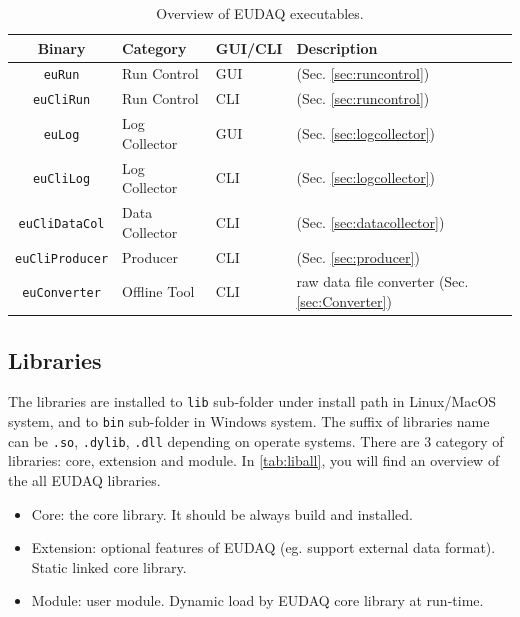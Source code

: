 \begin{table}
\centering
\small
\begin{tabular}{ c | l | l | p{4cm}}
  \textbf{Binary} & \textbf{Category} & \textbf{GUI/CLI}  & \textbf{Description}\\
  \hline
  \hline
  \texttt{euRun} & Run Control & GUI & (Sec. \ref{sec:runcontrol}) \\
  \texttt{euCliRun} & Run Control & CLI & (Sec. \ref{sec:runcontrol}) \\
  \texttt{euLog} & Log Collector & GUI & (Sec. \ref{sec:logcollector}) \\
  \texttt{euCliLog} & Log Collector & CLI & (Sec. \ref{sec:logcollector}) \\
  \texttt{euCliDataCol} & Data Collector & CLI & (Sec. \ref{sec:datacollector}) \\
  \texttt{euCliProducer} & Producer & CLI & (Sec. \ref{sec:producer}) \\
  \hline
  \texttt{euConverter} & Offline Tool & CLI & raw data file converter (Sec. \ref{sec:Converter}) \\
\end{tabular}
\caption{Overview of EUDAQ executables.}
\label{tab:exesall}
\end{table}


\subsection{Libraries}
The libraries are installed to \texttt{lib} sub-folder under install path in Linux/MacOS system, and to \texttt{bin} sub-folder in Windows system. The suffix of libraries name can be \texttt{.so}, \texttt{.dylib}, \texttt{.dll} depending on operate systems. There are 3 category of libraries: core, extension and module. In \autoref{tab:liball}, you will find an overview of the all EUDAQ libraries.\\

\begin{itemize}
\item Core: the core library. It should be always build and installed.
\item Extension: optional features of EUDAQ (eg. support external data format). Static linked core library.
\item Module: user module. Dynamic load by EUDAQ core library at run-time.
\end{itemize}

